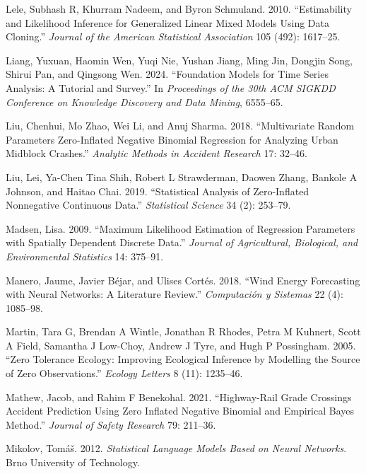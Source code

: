 \documentclass[
  letterpaper,
  double,
  12pt,
  1.0in]{beavtex}
\newlength{\cslhangindent}
\newenvironment{CSLReferences}[2] %
 {\begin{list}{}{%
  \setlength{\itemindent}{0pt}
  \setlength{\leftmargin}{0pt}
  \setlength{\parsep}{0pt}
  \ifodd #1
   \setlength{\leftmargin}{\cslhangindent}
   \setlength{\itemindent}{-1\cslhangindent}
  \fi
  \setlength{\itemsep}{#2\baselineskip}}}
 {\end{list}}
\begin{document}
\begin{CSLReferences}{1}{0}
Lele, Subhash R, Khurram Nadeem, and Byron Schmuland. 2010.
{``Estimability and Likelihood Inference for Generalized Linear Mixed
Models Using Data Cloning.''} \emph{Journal of the American Statistical
Association} 105 (492): 1617--25.

Liang, Yuxuan, Haomin Wen, Yuqi Nie, Yushan Jiang, Ming Jin, Dongjin
Song, Shirui Pan, and Qingsong Wen. 2024. {``Foundation Models for Time
Series Analysis: A Tutorial and Survey.''} In \emph{Proceedings of the
30th ACM SIGKDD Conference on Knowledge Discovery and Data Mining},
6555--65.

Liu, Chenhui, Mo Zhao, Wei Li, and Anuj Sharma. 2018. {``Multivariate
Random Parameters Zero-Inflated Negative Binomial Regression for
Analyzing Urban Midblock Crashes.''} \emph{Analytic Methods in Accident
Research} 17: 32--46.

Liu, Lei, Ya-Chen Tina Shih, Robert L Strawderman, Daowen Zhang, Bankole
A Johnson, and Haitao Chai. 2019. {``Statistical Analysis of
Zero-Inflated Nonnegative Continuous Data.''} \emph{Statistical Science}
34 (2): 253--79.

Madsen, Lisa. 2009. {``Maximum Likelihood Estimation of Regression
Parameters with Spatially Dependent Discrete Data.''} \emph{Journal of
Agricultural, Biological, and Environmental Statistics} 14: 375--91.

Manero, Jaume, Javier Béjar, and Ulises Cortés. 2018. {``Wind Energy
Forecasting with Neural Networks: A Literature Review.''}
\emph{Computaci{ó}n y Sistemas} 22 (4): 1085--98.

Martin, Tara G, Brendan A Wintle, Jonathan R Rhodes, Petra M Kuhnert,
Scott A Field, Samantha J Low-Choy, Andrew J Tyre, and Hugh P
Possingham. 2005. {``Zero Tolerance Ecology: Improving Ecological
Inference by Modelling the Source of Zero Observations.''} \emph{Ecology
Letters} 8 (11): 1235--46.

Mathew, Jacob, and Rahim F Benekohal. 2021. {``Highway-Rail Grade
Crossings Accident Prediction Using Zero Inflated Negative Binomial and
Empirical Bayes Method.''} \emph{Journal of Safety Research} 79:
211--36.

Mikolov, Tomáš. 2012. \emph{Statistical Language Models Based on Neural
Networks}. Brno University of Technology.


\end{CSLReferences}
\end{document}
